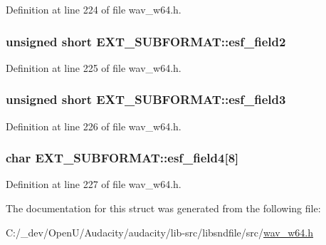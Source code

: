 Definition at line 224 of file wav\+\_\+w64.\+h.

\subsubsection[{\texorpdfstring{esf\+\_\+field2}{esf_field2}}]{\setlength{\rightskip}{0pt plus 5cm}unsigned short E\+X\+T\+\_\+\+S\+U\+B\+F\+O\+R\+M\+A\+T\+::esf\+\_\+field2}\hypertarget{struct_e_x_t___s_u_b_f_o_r_m_a_t_add78406adf8904bf86c058b1c425d2b6}{}\label{struct_e_x_t___s_u_b_f_o_r_m_a_t_add78406adf8904bf86c058b1c425d2b6}


Definition at line 225 of file wav\+\_\+w64.\+h.

\subsubsection[{\texorpdfstring{esf\+\_\+field3}{esf_field3}}]{\setlength{\rightskip}{0pt plus 5cm}unsigned short E\+X\+T\+\_\+\+S\+U\+B\+F\+O\+R\+M\+A\+T\+::esf\+\_\+field3}\hypertarget{struct_e_x_t___s_u_b_f_o_r_m_a_t_a3147359e88f43a8ba3cae5427f29271a}{}\label{struct_e_x_t___s_u_b_f_o_r_m_a_t_a3147359e88f43a8ba3cae5427f29271a}


Definition at line 226 of file wav\+\_\+w64.\+h.

\subsubsection[{\texorpdfstring{esf\+\_\+field4}{esf_field4}}]{\setlength{\rightskip}{0pt plus 5cm}char E\+X\+T\+\_\+\+S\+U\+B\+F\+O\+R\+M\+A\+T\+::esf\+\_\+field4\mbox{[}8\mbox{]}}\hypertarget{struct_e_x_t___s_u_b_f_o_r_m_a_t_aab7f636902cc16236b8dedabbbb8778d}{}\label{struct_e_x_t___s_u_b_f_o_r_m_a_t_aab7f636902cc16236b8dedabbbb8778d}


Definition at line 227 of file wav\+\_\+w64.\+h.



The documentation for this struct was generated from the following file\+:\begin{DoxyCompactItemize}
\item 
C\+:/\+\_\+dev/\+Open\+U/\+Audacity/audacity/lib-\/src/libsndfile/src/\hyperlink{wav__w64_8h}{wav\+\_\+w64.\+h}\end{DoxyCompactItemize}

